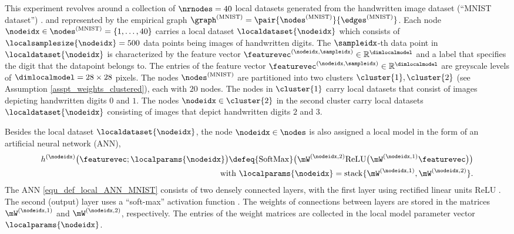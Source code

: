 \documentclass[lettersize,journal]{IEEEtran}
\newcommand{\graphmnist}{\graph^{(\rm MNIST)}}
\newcommand{\nodesmnist}{\nodes^{(\rm MNIST)}}
\newcommand{\edgesmnist}{\edges^{(\rm MNIST)}}
\begin{document}
This experiment revolves around a collection of $\nrnodes=40$ local datasets generated from the handwritten image 
dataset (``MNIST dataset'') \cite{LeCun1998}. and represented by the empirical graph $\graphmnist = \pair{\nodesmnist}{\edgesmnist}$. 
Each node $\nodeidx \in \nodesmnist=\{1,\ldots,40\}$ carries a local dataset $\localdataset{\nodeidx}$ which 
consists of $\localsamplesize{\nodeidx}=500$ data points being images of handwritten digits. 
The $\sampleidx$-th data point in $\localdataset{\nodeidx}$ is characterized by the feature vector $\featurevec^{(\nodeidx,\sampleidx)} \in \mathbb{R}^{\dimlocalmodel}$ and a label that specifies the digit that the datapoint belongs to.
The entries of  
the feature vector $\featurevec^{(\nodeidx,\sampleidx)} \in \mathbb{R}^{\dimlocalmodel}$ 
are greyscale levels of $\dimlocalmodel = 28 \times 28$ pixels. 
The nodes $\nodesmnist$ are partitioned into two clusters $\cluster{1},\cluster{2}$ (see Assumption \ref{asspt_weights_clustered}), 
each with $20$ nodes.  The nodes in $\cluster{1}$ carry local datasets that consist of images depicting 
handwritten digits $0$ and $1$. The nodes $\nodeidx \in \cluster{2}$ in the second cluster carry local datasets $\localdataset{\nodeidx}$ 
consisting of images that depict handwritten digits $2$ and $3$. 

Besides the local dataset $\localdataset{\nodeidx}$, the node $\nodeidx \in \nodes$ is also 
assigned a local model in the form of an artificial neural network (ANN),
\begin{equation} 
\label{equ_def_local_ANN_MNIST}
\begin{aligned}
    h^{(\nodeidx)} \big(\featurevec; \localparams{\nodeidx}\big) \defeq {\rm SoftMax}\big( \mW^{(\nodeidx,2)} {\rm ReLU} \big( \mW^{(\nodeidx,1)} \featurevec \big) \big) \\
    \mbox{ with } \localparams{\nodeidx} = {\rm stack} \{\mW^{(\nodeidx,1)} ,\mW^{(\nodeidx,2)}  \}.
\end{aligned}
\vspace{-2mm}
\end{equation} 
The ANN \eqref{equ_def_local_ANN_MNIST} consists of two densely connected layers, with 
the first layer using rectified linear units {\rm ReLU} \cite{Goodfellow-et-al-2016}. The second 
(output) layer uses a ``soft-max'' activation function \cite{Goodfellow-et-al-2016}. 
The weights of connections between layers are stored in the matrices $\mW^{(\nodeidx,1)}$ and $\mW^{(\nodeidx,2)}$, 
respectively. The entries of the weight matrices are collected in the local model parameter vector $\localparams{\nodeidx}$. 
\end{document}
